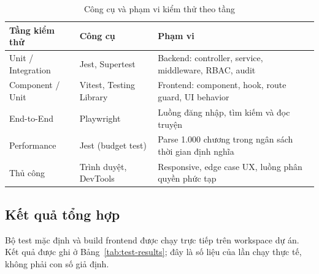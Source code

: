 \begin{table}[htbp]
\centering
\caption{Công cụ và phạm vi kiểm thử theo tầng}
\label{tab:test-tools}
\begin{tabularx}{\textwidth}{|>{\RaggedRight\arraybackslash}p{3.2cm}|>{\RaggedRight\arraybackslash}p{4.0cm}|X|}
\hline
\textbf{Tầng kiểm thử} & \textbf{Công cụ} & \textbf{Phạm vi} \\
\hline
Unit / Integration & Jest, Supertest & Backend: controller, service, middleware, RBAC, audit \\
\hline
Component / Unit & Vitest, Testing Library & Frontend: component, hook, route guard, UI behavior \\
\hline
End-to-End & Playwright & Luồng đăng nhập, tìm kiếm và đọc truyện \\
\hline
Performance & Jest (budget test) & Parse 1.000 chương trong ngân sách thời gian định nghĩa \\
\hline
Thủ công & Trình duyệt, DevTools & Responsive, edge case UX, luồng phân quyền phức tạp \\
\hline
\end{tabularx}
\end{table}

\subsection{Kết quả tổng hợp}

Bộ test mặc định và build frontend được chạy trực tiếp trên workspace dự án. Kết quả được ghi ở Bảng~\ref{tab:test-results}; đây là số liệu của lần chạy thực tế, không phải con số giả định.


